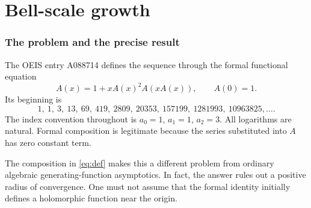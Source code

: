 \documentclass[11pt]{article}
\numberwithin{equation}{section}
\theoremstyle{definition}
\theoremstyle{remark}
\begin{document}
\begin{abstract}
\emph{Part~IV} (added October 4, 2026) proves that both measures have
strictly positive real-analytic densities on $(0,\infty)$ and supports
$[0,\infty)$, with density and derivative equivalents at zero; that the
correction to $F(s)\sim s^{-(3-\sqrt5)/2}$ is governed by a nonzero
real-analytic antiperiodic profile in $\log_\varphi\log s$,
$\varphi=(1+\sqrt5)/2$, with a convergent expansion in powers of
$1/\log s$; and that, with $\gamma_j=[z^j](1-zA(z))^{-2}$,
$c_n=\sum_{j\le K}\gamma_ja_{n-1-j}+O(a_{n-K-2})$ for every fixed $K$,
so that $c_n\sim a_{n-1}$.

\emph{Part~V} (added October 4, 2026) proves the complementary endpoint
estimate that Part~III left open, to every fixed order, and with it the
finer conjecture: $a_n=C_*\mathcal N_n(1+O(W(n)^5/n))$ with
$0<C_*<\infty$, so $a_n\sim C_*\mathsf B_n\exp(W(n)^2+3W(n))$, and
$c_n\sim C_*(W(n)/n)\mathcal N_n$ with the same constant. The value of
$C_*$ is not determined. This proof has not yet been independently
reviewed.
\end{abstract}
\newpage
\tableofcontents
\newpage

\part{Bell-scale growth}

\section{The problem and the precise result}

The OEIS entry A088714 defines the sequence through the formal functional
equation \cite{oeis-a088714}
\begin{equation}\label{eq:def}
 A(x)=1+xA(x)^2A(xA(x)),\qquad A(0)=1.
\end{equation}
Its beginning is
\[
1,\ 1,\ 3,\ 13,\ 69,\ 419,\ 2809,\ 20353,\ 157199,\ 1281993,\ 10963825,\ldots.
\]
The index convention throughout is $a_0=1$, $a_1=1$, $a_2=3$.
All logarithms are natural. Formal composition is legitimate because the
series substituted into $A$ has zero constant term.

The composition in \eqref{eq:def} makes this a different problem from
ordinary algebraic generating-function asymptotics. In fact, the answer
rules out a positive radius of convergence. One must not assume that the
formal identity initially defines a holomorphic function near the origin.
\end{document}
